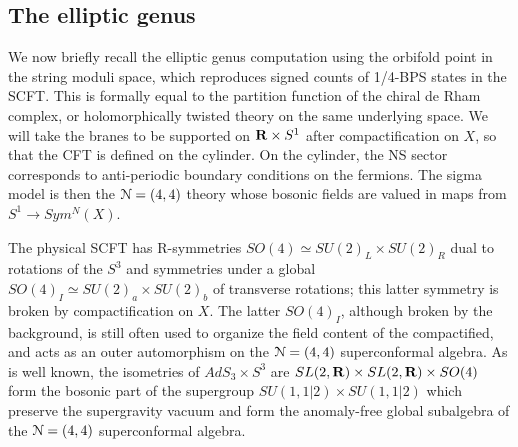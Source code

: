 \documentclass[../main.tex]{subfiles}
\begin{document}
\subsection{The elliptic genus}

We now briefly recall the elliptic genus computation using the orbifold point in the string moduli space, which reproduces signed counts of 1/4-BPS states in the SCFT. This is formally equal to the partition function of the chiral de Rham complex, or holomorphically twisted theory on the same underlying space. We will take the branes to be supported on $\mathbf{R} \times S^1$ after compactification on $X$, so that the CFT is defined on the cylinder. On the cylinder, the NS sector corresponds to anti-periodic boundary conditions on the fermions. The sigma model is then the $\mathcal N = (4,4)$ theory whose bosonic fields are valued in maps from $S^1 \rightarrow Sym^N(X)$.  

The physical SCFT has R-symmetries $SO(4) \simeq SU(2)_L \times SU(2)_R$ dual to rotations of the $S^3$ and symmetries under a global $SO(4)_I \simeq SU(2)_a \times SU(2)_b$ of transverse rotations; this latter symmetry is broken by compactification on $X$. The latter $SO(4)_I$, although broken by the background, is still often used to organize the field content of the compactified, and acts as an outer automorphism on the $\mathcal N=(4, 4)$ superconformal algebra. As is well known, the isometries of $AdS_3 \times S^3$ are $SL(2, \mathbf{R}) \times SL(2, \mathbf{R}) \times SO(4)$ form the bosonic part of the supergroup $SU(1,1|2) \times SU(1,1|2)$ which preserve the supergravity vacuum and form the anomaly-free global subalgebra of the $\mathcal N= (4,4)$ superconformal algebra.

\end{document}
